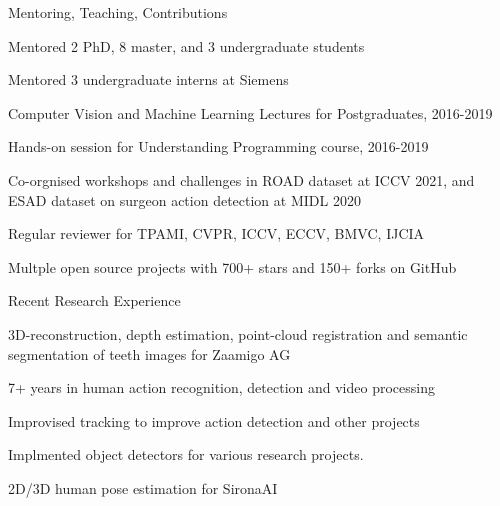 \documentclass{resume} %
\begin{document}
\begin{paracol}{2}


\begin{rSection}{Mentoring, Teaching, Contributions}{} 
\begin{sSubsection}{Mentored 2 PhD, 8 master, and 3 undergraduate students} \end{sSubsection} %
\begin{sSubsection}{Mentored 3 undergraduate interns at Siemens}\end{sSubsection}
\begin{sSubsection}{Computer Vision and Machine Learning Lectures for Postgraduates, 2016-2019}\end{sSubsection}
\begin{sSubsection}{Hands-on session for Understanding Programming course, 2016-2019}\end{sSubsection}
\begin{sSubsection}{Co-orgnised workshops and challenges in ROAD dataset at ICCV 2021, and ESAD dataset on surgeon action detection at MIDL 2020}\end{sSubsection}
\begin{sSubsection}{Regular reviewer for TPAMI, CVPR, ICCV, ECCV, BMVC, IJCIA}\end{sSubsection}
\begin{sSubsection}{Multple open source projects with 700+ stars and 150+ forks on GitHub}\end{sSubsection}
\end{rSection}

\begin{rSection}{Recent Research Experience}{} 
\begin{sSubsection}{3D-reconstruction, depth estimation, point-cloud registration and semantic segmentation of teeth images for Zaamigo AG}\end{sSubsection}
\begin{sSubsection}{7+ years in human action recognition, detection and  video processing}\end{sSubsection}
\begin{sSubsection}{Improvised tracking to improve action detection and other projects}\end{sSubsection}
\begin{sSubsection}{Implmented object detectors for various research projects.}\end{sSubsection}
\begin{sSubsection}{2D/3D human pose estimation for SironaAI}\end{sSubsection}


\end{rSection}
\end{paracol}
\end{document}
